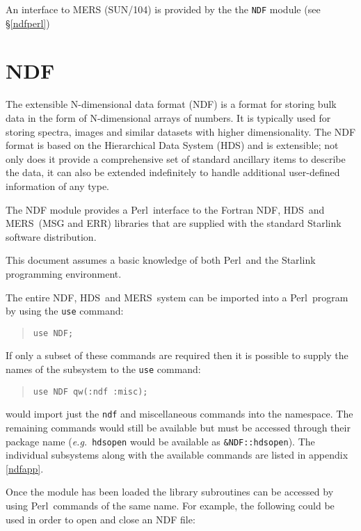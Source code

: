 \documentclass[twoside,11pt]{article}
\newenvironment{myquote}{\begin{quote}\begin{small}}{\end{small}\end{quote}}
\newcommand{\ndf}{\xref{NDF}{sun33}{}}
\newcommand{\perl}{\xref{\textsf{Perl}}{sun193}{}}
\newcommand{\hds}{\xref{HDS}{sun92}{}}
\newcommand{\mers}{\xref{MERS}{sun104}{}}
\newcommand{\xref}[3]{#1}
\renewcommand{\_}{\texttt{\symbol{95}}}
\begin{document}
An interface to MERS (\xref{SUN/104}{sun104}{}) is provided by the
the \texttt{NDF} module (see \S\ref{ndfperl})

\section{NDF\label{ndfperl}}

The extensible N-dimensional data format (NDF) is a format for storing bulk
data in the form of N-dimensional arrays of numbers.  It is typically used
for storing spectra, images and similar datasets with higher dimensionality.
The NDF format is based on the Hierarchical Data System (HDS) and is
extensible; not only does it provide a comprehensive set of standard
ancillary items to describe the data, it can also be extended indefinitely
to handle additional user-defined information of any type.

The NDF module provides a \perl\ interface to the Fortran \ndf, \hds\ and
\mers\ (MSG and ERR) libraries that are supplied with the standard Starlink
software distribution.

This document assumes a basic knowledge of both \perl\ and the Starlink
programming environment.

The entire \ndf, \hds\ and \mers\ system can be imported into a \perl\ program
by using the \texttt{use} command:

\begin{myquote}
\begin{verbatim}
use NDF;
\end{verbatim}
\end{myquote}

If only a subset of these commands are required then it is possible to supply
the names of the subsystem to the \texttt{use} command:

\begin{myquote}
\begin{verbatim}
use NDF qw(:ndf :misc);
\end{verbatim}
\end{myquote}

would import just the \texttt{ndf\_} and miscellaneous commands into
the namespace. The remaining commands would still be available but must
be accessed through their package name (\emph{e.g.}\ \texttt{hds\_open}
would be available as \texttt{\&NDF::hds\_open}). The individual
subsystems along with the available commands are listed in appendix
\ref{ndfapp}.

Once the module has been loaded the library subroutines can be accessed
by using \perl\ commands of the same name. For example, the following
could be used in order to open and close an NDF file:
\end{document}
